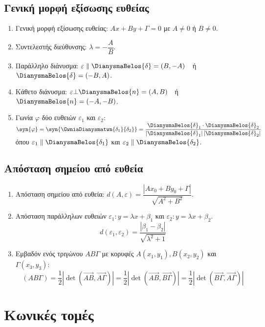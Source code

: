 \documentclass[11pt,a4paper]{article}
\begin{document}
\subsection{Γενική μορφή εξίσωσης ευθείας}
\begin{enumerate}
\item Γενική μορφή εξίσωσης ευθείας: $ Ax+By+\varGamma=0 $ με $ A\neq0 $ ή $ B\neq0 $.
\item Συντελεστής διεύθυνσης: $ \lambda=-\dfrac{A}{B} $.
\item Παράλληλο διάνυσμα: $ \varepsilon\parallel\DianysmaBelos{\delta}=(B,-A) $\ \ ή\ \ $ \DianysmaBelos{\delta}=(-B,A) $.
\item Κάθετο διάνυσμα: $ \varepsilon\bot\DianysmaBelos{n}=(A,B) $\ \ ή\ \ $ \DianysmaBelos{n}=(-A,-B) $.
\item Γωνία $ \varphi $ δύο ευθειών $ \varepsilon_1 $ και $ \varepsilon_2 $: $ \syn{\varphi}=\syn{\GwniaDianysmatwn{\delta_{1}}{\delta_{2}}}=\dfrac{\DianysmaBelos{\delta}_{1} \cdot \DianysmaBelos{\delta}_{2}}{\left|\DianysmaBelos{\delta}_{1}\right|\left|\DianysmaBelos{\delta}_{2}\right|}$ όπου $ \varepsilon_1\parallel\DianysmaBelos{\delta_1} $ και $ \varepsilon_2\parallel\DianysmaBelos{\delta_2} $.
\end{enumerate}
\subsection{Απόσταση σημείου από ευθεία}
\begin{enumerate}
\item Απόσταση σημείου από ευθεία: $ d(A,\varepsilon)=\dfrac{|Ax_0+By_0+\varGamma|}{\sqrt{A^2+B^2}} $.
\item Απόσταση παράλληλων ευθειών $ \varepsilon_1:y=\lambda x+\beta_1 $ και $ \varepsilon_2:y=\lambda x+\beta_2 $. 
\[ d(\varepsilon_1,\varepsilon_2)=\dfrac{|\beta_1-\beta_2|}{\sqrt{\lambda^2+1}} \]
\item Εμβαδόν ενός τριγώνου $ AB\varGamma $ με κορυφές $ A(x_1,y_1),B(x_2,y_2) $ και $ \varGamma(x_3,y_3) $:
\[ (AB\varGamma)=\frac{1}{2}\left|\det{(\overrightarrow{AB},\overrightarrow{A\varGamma})} \right|=\frac{1}{2}\left|\det{(\overrightarrow{AB},\overrightarrow{B\varGamma})} \right|=\frac{1}{2}\left|\det{(\overrightarrow{B\varGamma},\overrightarrow{A\varGamma})} \right| \]
\end{enumerate}
\newpage
\section{Κωνικές τομές}
\end{document}
